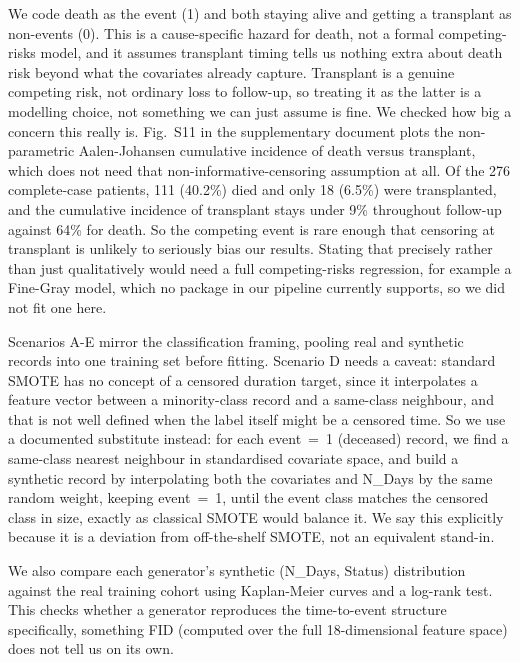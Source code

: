 \documentclass[journal]{IEEEtran}
\begin{document}
We code death as the event (1) and both staying alive and getting a transplant as non-events (0). This is a cause-specific hazard for death, not a formal competing-risks model, and it assumes transplant timing tells us nothing extra about death risk beyond what the covariates already capture. Transplant is a genuine competing risk, not ordinary loss to follow-up, so treating it as the latter is a modelling choice, not something we can just assume is fine. We checked how big a concern this really is. Fig.~S11 in the supplementary document plots the non-parametric Aalen-Johansen cumulative incidence of death versus transplant, which does not need that non-informative-censoring assumption at all. Of the 276 complete-case patients, 111 (40.2\%) died and only 18 (6.5\%) were transplanted, and the cumulative incidence of transplant stays under 9\% throughout follow-up against 64\% for death. So the competing event is rare enough that censoring at transplant is unlikely to seriously bias our results. Stating that precisely rather than just qualitatively would need a full competing-risks regression, for example a Fine-Gray model, which no package in our pipeline currently supports, so we did not fit one here.

Scenarios A-E mirror the classification framing, pooling real and synthetic records into one training set before fitting. Scenario D needs a caveat: standard SMOTE has no concept of a censored duration target, since it interpolates a feature vector between a minority-class record and a same-class neighbour, and that is not well defined when the label itself might be a censored time. So we use a documented substitute instead: for each event~=~1 (deceased) record, we find a same-class nearest neighbour in standardised covariate space, and build a synthetic record by interpolating both the covariates and N\_Days by the same random weight, keeping event~=~1, until the event class matches the censored class in size, exactly as classical SMOTE would balance it. We say this explicitly because it is a deviation from off-the-shelf SMOTE, not an equivalent stand-in.

We also compare each generator's synthetic (N\_Days, Status) distribution against the real training cohort using Kaplan-Meier curves and a log-rank test. This checks whether a generator reproduces the time-to-event structure specifically, something FID (computed over the full 18-dimensional feature space) does not tell us on its own.

\FloatBarrier
\end{document}
